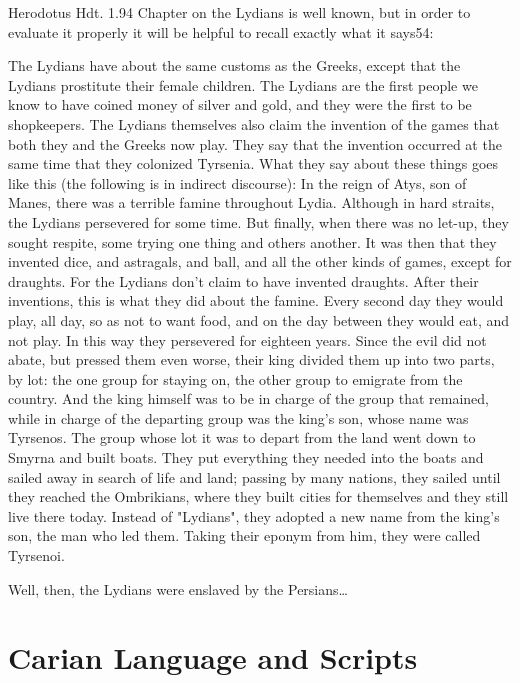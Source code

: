Herodotus Hdt. 1.94 
Chapter on the Lydians is well known, but in order to evaluate it properly it will be
helpful to recall exactly what it says54:

\begin{latexquotation}
The Lydians have about the same customs as the Greeks, except that the
Lydians prostitute their female children. The Lydians are the first people
we know to have coined money of silver and gold, and they were the first to
be shopkeepers. The Lydians themselves also claim the invention of the
games that both they and the Greeks now play. They say that the invention
occurred at the same time that they colonized Tyrsenia. What they say
about these things goes like this (the following is in indirect discourse):
In the reign of Atys, son of Manes, there was a terrible famine
throughout Lydia. Although in hard straits, the Lydians persevered for
some time. But finally, when there was no let-up, they sought respite,
some trying one thing and others another. It was then that they invented
dice, and astragals, and ball, and all the other kinds of games, except for
draughts. For the Lydians don't claim to have invented draughts. After
their inventions, this is what they did about the famine. Every second
day they would play, all day, so as not to want food, and on the day
between they would eat, and not play. In this way they persevered for
eighteen years. Since the evil did not abate, but pressed them even
worse, their king divided them up into two parts, by lot: the one group
for staying on, the other group to emigrate from the country. And the
king himself was to be in charge of the group that remained, while in
charge of the departing group was the king's son, whose name was
Tyrsenos. The group whose lot it was to depart from the land went down
to Smyrna and built boats. They put everything they needed into the
boats and sailed away in search of life and land; passing by many
nations, they sailed until they reached the Ombrikians, where they built
cities for themselves and they still live there today. Instead of "Lydians",
they adopted a new name from the king's son, the man who led them.
Taking their eponym from him, they were called Tyrsenoi.

Well, then, the Lydians were enslaved by the Persians\ldots
\end{latexquotation}



\chapter{Carian Language and Scripts}
\def\textcarian#1{\begingroup\bfseries\lydianfont\color{red}#1\endgroup}

